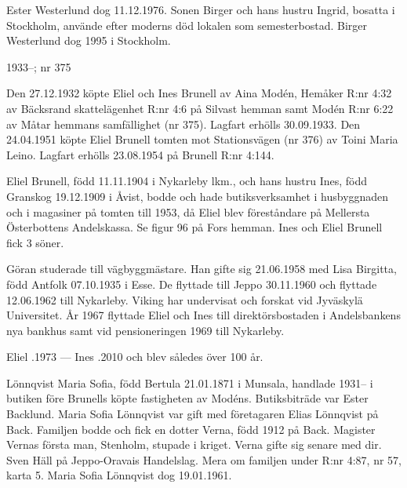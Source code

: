 Ester Westerlund dog 11.12.1976. Sonen Birger och hans hustru Ingrid, bosatta i Stockholm, använde efter moderns död lokalen som semesterbostad. Birger Westerlund dog 1995 i Stockholm.



 1933--; nr 375

Den 27.12.1932 köpte Eliel och Ines Brunell av Aina Modén, Hemåker R:nr 4:32 av Bäcksrand skattelägenhet R:nr 4:6 på Silvast hemman samt Modén R:nr 6:22 av Måtar hemmans samfällighet (nr 375). Lagfart erhölls 30.09.1933. Den 24.04.1951 köpte Eliel Brunell tomten mot Stationsvägen (nr 376) av Toini Maria Leino. Lagfart erhölls 23.08.1954 på Brunell R:nr 4:144.

Eliel Brunell, född 11.11.1904 i Nykarleby lkm., och hans hustru Ines, född Granskog 19.12.1909 i Åvist, bodde och hade butiksverksamhet i husbyggnaden och i magasiner på tomten till 1953, då Eliel blev föreståndare på Mellersta Österbottens Andelskassa. Se figur 96 på Fors hemman. Ines och Eliel Brunell fick 3 söner.
\begin{jhchildren}
  \item {}
  \item {}
  \item {}
\end{jhchildren}
Göran studerade till vägbyggmästare. Han gifte sig 21.06.1958 med Lisa Birgitta, född Antfolk 07.10.1935 i Esse. De flyttade till Jeppo 30.11.1960 och flyttade 12.06.1962 till Nykarleby. Viking har undervisat och forskat vid Jyväskylä Universitet. År 1967 flyttade Eliel och Ines till direktörsbostaden i Andelsbankens nya bankhus samt vid pensioneringen 1969 till Nykarleby.

Eliel .1973  --- Ines .2010 och blev således över 100 år.

Lönnqvist Maria Sofia, född Bertula 21.01.1871 i Munsala, handlade 1931-- i butiken före Brunells köpte fastigheten av Modéns. Butiksbiträde var Ester Backlund. Maria Sofia Lönnqvist var gift med företagaren Elias Lönnqvist på Back. Familjen bodde och fick en dotter Verna, född 1912 på Back. Magister Vernas första man, Stenholm, stupade i kriget. Verna gifte sig senare med dir. Sven Häll på Jeppo-Oravais Handelslag. Mera om familjen under R:nr 4:87, nr 57, karta 5. Maria Sofia Lönnqvist dog 19.01.1961.


